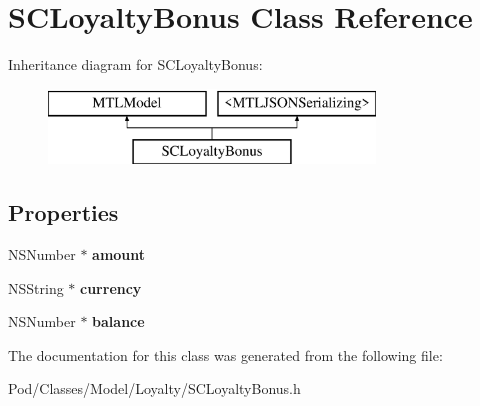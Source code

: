 \hypertarget{interface_s_c_loyalty_bonus}{}\section{S\+C\+Loyalty\+Bonus Class Reference}
\label{interface_s_c_loyalty_bonus}
Inheritance diagram for S\+C\+Loyalty\+Bonus\+:\begin{figure}[H]
\begin{center}
\leavevmode
\includegraphics[height=2.000000cm]{interface_s_c_loyalty_bonus}
\end{center}
\end{figure}
\subsection*{Properties}
\begin{DoxyCompactItemize}
\item 
N\+S\+Number $\ast$ {\bfseries amount}\hypertarget{interface_s_c_loyalty_bonus_a5f798bff40f7d6151c3eb4f1edc51d4c}{}\label{interface_s_c_loyalty_bonus_a5f798bff40f7d6151c3eb4f1edc51d4c}

\item 
N\+S\+String $\ast$ {\bfseries currency}\hypertarget{interface_s_c_loyalty_bonus_a897d8095b8735ae8ed61022f067385b3}{}\label{interface_s_c_loyalty_bonus_a897d8095b8735ae8ed61022f067385b3}

\item 
N\+S\+Number $\ast$ {\bfseries balance}\hypertarget{interface_s_c_loyalty_bonus_aa31ecdb5869c9f614518755f2b7fde94}{}\label{interface_s_c_loyalty_bonus_aa31ecdb5869c9f614518755f2b7fde94}

\end{DoxyCompactItemize}


The documentation for this class was generated from the following file\+:\begin{DoxyCompactItemize}
\item 
Pod/\+Classes/\+Model/\+Loyalty/S\+C\+Loyalty\+Bonus.\+h\end{DoxyCompactItemize}
